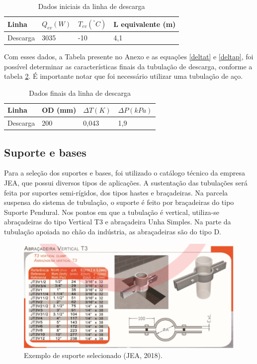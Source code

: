 \documentclass[10pt,a4paper]{article}
\begin{document}
\begin{table}[h!]
\centering
\caption{Dados iniciais da linha de descarga}
\begin{tabular}{|l|l|l|l|}
\hline
Linha    & $Q_{ev} (W)$ & $T_{ev} (^°C)$ & L equivalente (m) \\ \hline
Descarga & 3035    & -10      & 4,1               \\ \hline
\end{tabular}
\label{descarga}
\end{table}

Com esses dados, a Tabela presente no Anexo e as equações \ref{deltat} e \ref{deltap}, foi possível determinar as características finais da tubulação de descarga, conforme a tabela \ref{descg}. É importante notar que foi necessário utilizar uma tubulação de aço. 

\begin{table}[h!]
\centering
\caption{Dados finais da linha de descarga}
\begin{tabular}{|l|l|l|l|}
\hline
Linha    & OD (mm) & $\Delta T (K)$ & $\Delta P (kPa)$ \\ \hline
Descarga & 200     & 0,043       & 1,9           \\ \hline
\end{tabular}
\label{descg}
\end{table}

\subsection{{Suporte e bases}}

Para a seleção dos suportes e bases, foi utilizado o catálogo técnico da empresa JEA, que possui diversos tipos de aplicações. A sustentação das tubulações será feita por suportes semi-rígidos, dos tipos hastes e braçadeiras. Na parcela suspensa do sistema de tubulação, o suporte é feito por braçadeiras do tipo Suporte Pendural. Nos pontos em que a tubulação é vertical, utiliza-se abraçadeiras do tipo Vertical T3 e abraçadeira Unha Simples. Na parte da tubulação apoiada no chão da indústria, as abraçadeiras são do tipo D.

\begin{figure}[h!]
    \centering
    \vspace{0.8mm}
    \includegraphics{Figuras/exemplosuporte.PNG}
    \caption{Exemplo de suporte selecionado (JEA, 2018).}
    \label{fig:suporte}
\end{figure}
\end{document}
